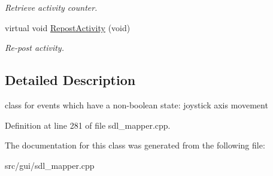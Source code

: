 \begin{DoxyCompactItemize}
\begin{DoxyCompactList}\small\item\em Retrieve activity counter. \end{DoxyCompactList}\item 
\hypertarget{classCContinuousEvent_a55ff5be014e082075eaeec0af43a51aa}{virtual void \hyperlink{classCContinuousEvent_a55ff5be014e082075eaeec0af43a51aa}{Repost\-Activity} (void)}\label{classCContinuousEvent_a55ff5be014e082075eaeec0af43a51aa}

\begin{DoxyCompactList}\small\item\em Re-\/post activity. \end{DoxyCompactList}\end{DoxyCompactItemize}


\subsection{Detailed Description}
class for events which have a non-\/boolean state\-: joystick axis movement 

Definition at line 281 of file sdl\-\_\-mapper.\-cpp.



The documentation for this class was generated from the following file\-:\begin{DoxyCompactItemize}
\item 
src/gui/sdl\-\_\-mapper.\-cpp\end{DoxyCompactItemize}
